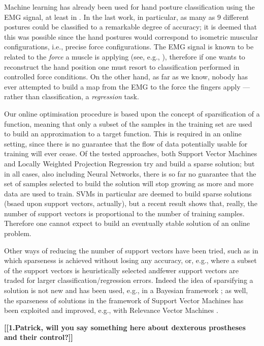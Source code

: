 Machine learning has already been used for hand posture classification
using the EMG signal, at least in \cite{dunlop,fukuda,smagt}. In the
last work, in particular, as many as $9$ different postures could be
classified to a remarkable degree of accuracy; it is deemed that this
was possible since the hand postures would correspond to isometric
muscular configurations, i.e., precise force configurations. The EMG
signal is known to be related to the \emph{force} a muscle is applying
(see, e.g., \cite{deluca}), therefore if one wants to reconstruct the
hand position one must resort to classification performed in
controlled force conditions. On the other hand, as far as we know,
nobody has ever attempted to build a map from the EMG to the force the
fingers apply --- rather than classification, a \emph{regression}
task.

Our online optimisation procedure is based upon the concept of
sparsification of a function, meaning that only a subset of the
samples in the training set are used to build an approximation to a
target function. This is required in an online setting, since there is
no guarantee that the flow of data potentially usable for training
will ever cease. Of the tested approaches, both Support Vector
Machines and Locally Weighted Projection Regression try and build a
sparse solution; but in all cases, also including Neural Networks,
there is so far no guarantee that the set of samples selected to build
the solution will stop growing as more and more data are used to
train. SVMs in particular are deemed to build sparse solutions (bsaed
upon support vectors, actually), but a recent result
\cite{Steinwart03} shows that, really, the number of support vectors
is proportional to the number of training samples. Therefore one
cannot expect to build an eventually stable solution of an online
problem.

Other ways of reducing the number of support vectors have been tried,
such as \cite{bmvc} in which sparseness is achieved without losing any
accuracy, or, e.g., \cite{LeeM01,KeerthiCDC06} where a subset of the
support vectors is heuristically selected andfewer support vectors are
traded for larger classification/regression errors. Indeed the idea of
sparsifying a solution is not new and has been used, e.g., in a
Bayesian framework \cite{figueiredo03adaptive}; as well, the
sparseness of solutions in the framework of Support Vector Machines
has been exploited and improved, e.g., with Relevance Vector Machines
\cite{tipping00relevance}.

\textbf{[[1.Patrick, will you say something here about dexterous
prostheses and their control?]]}

